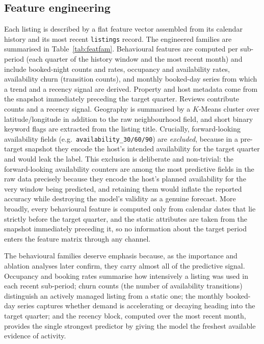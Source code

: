 \documentclass[journal]{IEEEtran}
\begin{document}
\subsection{Feature engineering}
Each listing is described by a flat feature vector assembled from its calendar
history and its most recent \texttt{listings} record. The engineered families are
summarised in Table~\ref{tab:featfam}. Behavioural features are computed per
sub-period (each quarter of the history window and the most recent month) and
include booked-night counts and rates, occupancy and availability rates,
availability churn (transition counts), and monthly booked-day series from which a
trend and a recency signal are derived. Property and host metadata come from the
snapshot immediately preceding the target quarter. Reviews contribute counts and a
recency signal. Geography is summarised by a $K$-Means cluster over
latitude/longitude in addition to the raw neighbourhood field, and short binary
keyword flags are extracted from the listing title. Crucially, forward-looking
availability fields (e.g.\ \texttt{availability\_30/60/90}) are \emph{excluded},
because in a pre-target snapshot they encode the host's intended availability for
the target quarter and would leak the label. This exclusion is deliberate and
non-trivial: the forward-looking availability counters are among the most
predictive fields in the raw data precisely because they encode the host's planned
availability for the very window being predicted, and retaining them would inflate
the reported accuracy while destroying the model's validity as a genuine forecast.
More broadly, every behavioural feature is computed only from calendar dates that
lie strictly before the target quarter, and the static attributes are taken from
the snapshot immediately preceding it, so no information about the target period
enters the feature matrix through any channel.

The behavioural families deserve emphasis because, as the importance and ablation
analyses later confirm, they carry almost all of the predictive signal. Occupancy
and booking rates summarise how intensively a listing was used in each recent
sub-period; churn counts (the number of availability transitions) distinguish an
actively managed listing from a static one; the monthly booked-day series captures
whether demand is accelerating or decaying heading into the target quarter; and the
recency block, computed over the most recent month, provides the single strongest
predictor by giving the model the freshest available evidence of activity.
\end{document}
